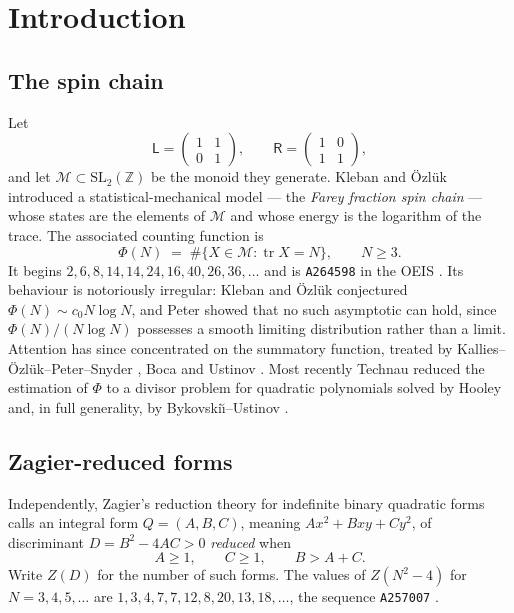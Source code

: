 \documentclass[11pt,reqno]{amsart}
\theoremstyle{plain}
\theoremstyle{definition}
\newcommand{\Z}{\mathbb{Z}}
\newcommand{\Ll}{\mathsf{L}}
\newcommand{\Rr}{\mathsf{R}}
\newcommand{\Mon}{\mathcal{M}}
\newcommand{\tr}{\operatorname{tr}}
\newcommand{\SL}{\mathrm{SL}}
\begin{document}
\maketitle

\section{Introduction}

\subsection{The spin chain}
Let
\[
  \Ll=\begin{pmatrix}1&1\\0&1\end{pmatrix},\qquad
  \Rr=\begin{pmatrix}1&0\\1&1\end{pmatrix},
\]
and let $\Mon\subset\SL_2(\Z)$ be the monoid they generate. Kleban and \"Ozl\"uk
\cite{KO} introduced a statistical-mechanical model --- the \emph{Farey fraction spin
chain} --- whose states are the elements of $\Mon$ and whose energy is the logarithm of
the trace. The associated counting function is
\begin{equation}\label{eq:Phi}
  \Phi(N)\;=\;\#\{X\in\Mon:\tr X=N\},\qquad N\ge 3 .
\end{equation}
It begins $2,6,8,14,14,24,16,40,26,36,\dots$ and is \texttt{A264598} in the OEIS
\cite{OEISA264598}. Its behaviour is notoriously irregular: Kleban and \"Ozl\"uk
conjectured $\Phi(N)\sim c_0N\log N$, and Peter \cite{Peter} showed that no such
asymptotic can hold, since $\Phi(N)/(N\log N)$ possesses a smooth limiting distribution
rather than a limit. Attention has since concentrated on the summatory function, treated
by Kallies--\"Ozl\"uk--Peter--Snyder \cite{KOPS}, Boca \cite{Boca} and Ustinov
\cite{Ustinov}. Most recently Technau \cite{Technau} reduced the estimation of $\Phi$ to
a divisor problem for quadratic polynomials solved by Hooley \cite{Hooley} and, in full
generality, by Bykovski\u\i--Ustinov \cite{BU}.

\subsection{Zagier-reduced forms}
Independently, Zagier's reduction theory for indefinite binary quadratic forms
\cite[\S13]{Zagier} calls an integral form $Q=(A,B,C)$, meaning $Ax^2+Bxy+Cy^2$, of
discriminant $D=B^2-4AC>0$ \emph{reduced} when
\begin{equation}\label{eq:zagred}
  A\ge 1,\qquad C\ge 1,\qquad B>A+C .
\end{equation}
Write $Z(D)$ for the number of such forms. The values of $Z(N^2-4)$ for $N=3,4,5,\dots$
are $1,3,4,7,7,12,8,20,13,18,\dots$, the sequence \texttt{A257007} \cite{OEISA257007}.
\end{document}
